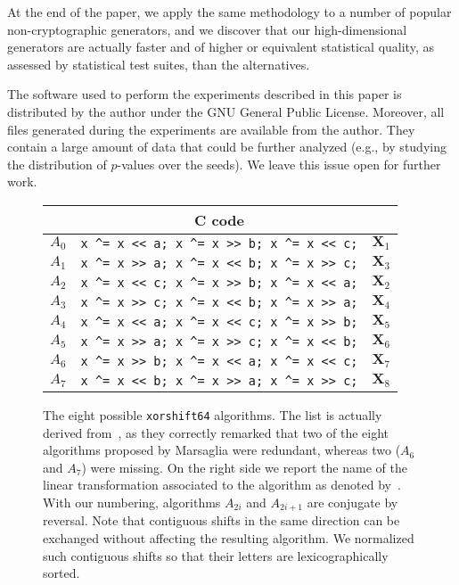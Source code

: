 \documentclass{acmsmalltr}
\newcommand{\xorshift}[1][]{\texttt{xorshift#1}\xspace}
\begin{document}
At the end of the paper, we apply the same methodology to a number of popular
non-cryptographic generators, and we discover that our high-dimensional
generators are actually faster and of higher or equivalent statistical quality,
as assessed by statistical test suites, than the alternatives.

The software used to perform the experiments described in this paper is
distributed by the author under the GNU General Public License. Moreover,
all files generated during the experiments are available from the author. They contain a large
amount of data that could be further analyzed (e.g., by studying the
distribution of $p$-values over the seeds). We leave this issue open
for further work.

\begin{figure}
\centering
\begin{tabular}{l|c|l}
& C code & \\
\hline
$A_0$ & \verb.x ^= x << a; x ^= x >> b; x ^= x << c;.  & $\mathbf{X}_1$\\
$A_1$ & \verb.x ^= x >> a; x ^= x << b; x ^= x >> c;. & $\mathbf{X}_3$\\
$A_2$ & \verb.x ^= x << c; x ^= x >> b; x ^= x << a;. & $\mathbf{X}_2$\\
$A_3$ & \verb.x ^= x >> c; x ^= x << b; x ^= x >> a;. & $\mathbf{X}_4$\\
$A_4$ & \verb.x ^= x << a; x ^= x << c; x ^= x >> b;. & $\mathbf{X}_5$\\
$A_5$ & \verb.x ^= x >> a; x ^= x >> c; x ^= x << b;. & $\mathbf{X}_6$\\
$A_6$ & \verb.x ^= x >> b; x ^= x << a; x ^= x << c;. & $\mathbf{X}_7$\\
$A_7$ & \verb.x ^= x << b; x ^= x >> a; x ^= x >> c;. & $\mathbf{X}_8$
\end{tabular}
\caption{\label{tab:algo}The eight possible \xorshift[64] algorithms.  
The list is actually derived from~\protect{},
as they correctly remarked that two of the eight algorithms proposed 
by Marsaglia were redundant, whereas two ($A_6$ and $A_7$) were missing.
On the right side we report the name of the linear transformation associated to
the algorithm as denoted by~\protect{}. With our numbering,
algorithms $A_{2i}$ and $A_{2i+1}$ are conjugate by reversal. Note that contiguous shifts
in the same direction can be exchanged without affecting the resulting
algorithm. We normalized such contiguous shifts so that their letters are
lexicographically sorted.}
\end{figure}
\end{document}
